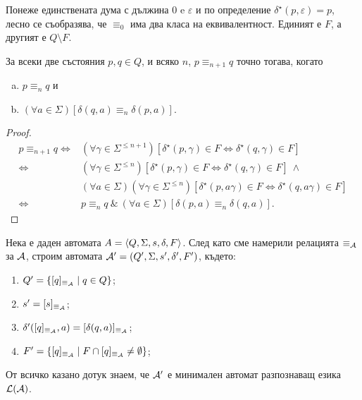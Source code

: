 Понеже единствената дума с дължина $0$ e $\varepsilon$ и по определение $\delta^\star(p,\varepsilon) = p$, 
лесно се съобразява, че $\equiv_0$ има два класа на еквивалентност.
Единият е $F$, а другият е $Q\setminus F$.

\begin{prop}
  За всеки две състояния $p,q \in Q$, и всяко $n$, $p \equiv_{n+1} q$ точно тогава, когато
  \begin{enumerate}[a)]
  \item
    $p \equiv_{n} q$ и
  \item
    $(\forall a \in \Sigma)[\delta(q,a) \equiv_{n} \delta(p,a)]$.
  \end{enumerate}
\end{prop}
\begin{proof}
  \begin{align*}
    p \equiv_{n+1} q \iff & (\forall \gamma\in\Sigma^{\leq n+1})[\delta^\star(p,\gamma)\in F \iff \delta^\star(q,\gamma) \in F]\\
    \iff & (\forall \gamma\in\Sigma^{\leq n})[\delta^\star(p,\gamma)\in F \iff \delta^\star(q,\gamma) \in F]\ \wedge\ \\
    & (\forall a\in\Sigma)(\forall \gamma\in\Sigma^{\leq n})[\delta^\star(p, a\gamma)\in F \iff \delta^\star(q, a\gamma) \in F]\\
    \iff & p \equiv_n q\ \&\ (\forall a\in\Sigma)[\delta(p,a) \equiv_n \delta(q,a)].
  \end{align*}
\end{proof}

Нека е даден автомата $A = \langle{Q,\Sigma,s,\delta,F}\rangle$.
След като сме намерили релацията $\equiv_{\mathcal{A}}$ за $\mathcal{A}$, 
строим автомата $\mathcal{A}' = (Q',\Sigma,s',\delta',F')$, където:
\begin{enumerate}[1)]
\item
  $Q' = \{[q]_{\equiv_{\mathcal{A}}} \mid q\in Q\}$;
\item
  $s' = [s]_{\equiv_{\mathcal{A}}}$;
\item
  $\delta'([q]_{\equiv_{\mathcal{A}}}, a) = [\delta(q,a)]_{\equiv_{\mathcal{A}}}$;
\item
  $F' = \{[q]_{\equiv_{\mathcal{A}}}\mid F\cap [q]_{\equiv_{\mathcal{A}}} \neq \emptyset\}$;
\end{enumerate}

От всичко казано дотук знаем, че $\mathcal{A}'$ е минимален автомат разпознаващ езика $\mathcal{L}(\mathcal{A})$.

